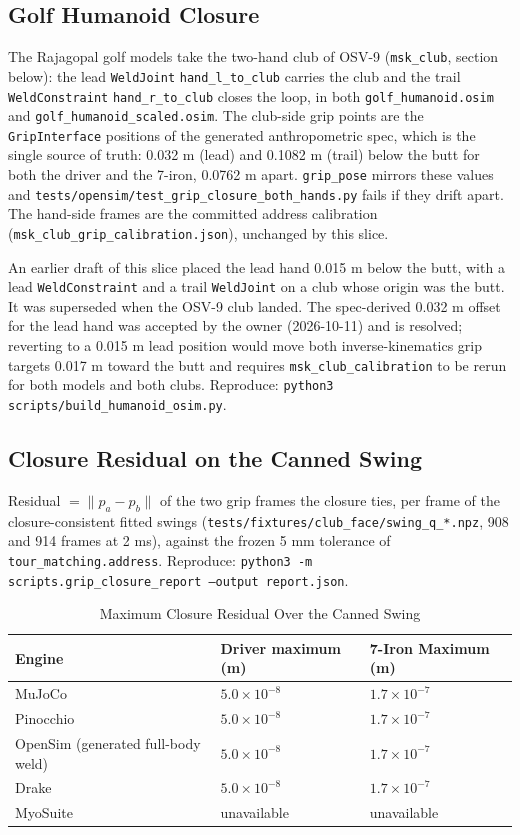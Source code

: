 \documentclass[11pt,a4paper]{article}
\begin{document}
\subsection{Golf Humanoid Closure}
The Rajagopal golf models take the two-hand club of OSV-9
(\texttt{msk\_club}, section below): the lead \texttt{WeldJoint}
\texttt{hand\_l\_to\_club} carries the club and the trail
\texttt{WeldConstraint} \texttt{hand\_r\_to\_club} closes the loop, in both
\texttt{golf\_humanoid.osim} and \texttt{golf\_humanoid\_scaled.osim}. The
club-side grip points are the \texttt{GripInterface} positions of the
generated anthropometric spec, which is the single source of truth: 0.032 m
(lead) and 0.1082 m (trail) below the butt for both the driver and the
7-iron, 0.0762 m apart. \texttt{grip\_pose} mirrors these values and
\texttt{tests/opensim/test\_grip\_closure\_both\_hands.py} fails if they
drift apart. The hand-side frames are the committed address calibration
(\texttt{msk\_club\_grip\_calibration.json}), unchanged by this slice.

An earlier draft of this slice placed the lead hand 0.015 m below the butt,
with a lead \texttt{WeldConstraint} and a trail \texttt{WeldJoint} on a club
whose origin was the butt. It was superseded when the OSV-9 club landed. The
spec-derived 0.032 m offset for the lead hand was accepted by the owner
(2026-10-11) and is resolved; reverting to a 0.015 m lead position would move
both inverse-kinematics grip targets 0.017 m toward the butt and requires
\texttt{msk\_club\_calibration} to be rerun for both models and both clubs.
Reproduce: \texttt{python3 scripts/build\_humanoid\_osim.py}.

\subsection{Closure Residual on the Canned Swing}
Residual $=\lVert p_a-p_b\rVert$ of the two grip frames the closure ties, per
frame of the closure-consistent fitted swings
(\texttt{tests/fixtures/club\_face/swing\_q\_*.npz}, 908 and 914 frames at
2 ms), against the frozen 5 mm tolerance of
\texttt{tour\_matching.address}. Reproduce:
\texttt{python3 -m scripts.grip\_closure\_report --output report.json}.

\begin{table}[h]
\centering
\begin{tabular}{lll}
\hline
Engine & Driver maximum (m) & 7-Iron Maximum (m) \\
\hline
MuJoCo & $5.0\times10^{-8}$ & $1.7\times10^{-7}$ \\
Pinocchio & $5.0\times10^{-8}$ & $1.7\times10^{-7}$ \\
OpenSim (generated full-body weld) & $5.0\times10^{-8}$ & $1.7\times10^{-7}$ \\
Drake & $5.0\times10^{-8}$ & $1.7\times10^{-7}$ \\
MyoSuite & unavailable & unavailable \\
\hline
\end{tabular}
\caption{Maximum Closure Residual Over the Canned Swing}
\end{table}
\end{document}
